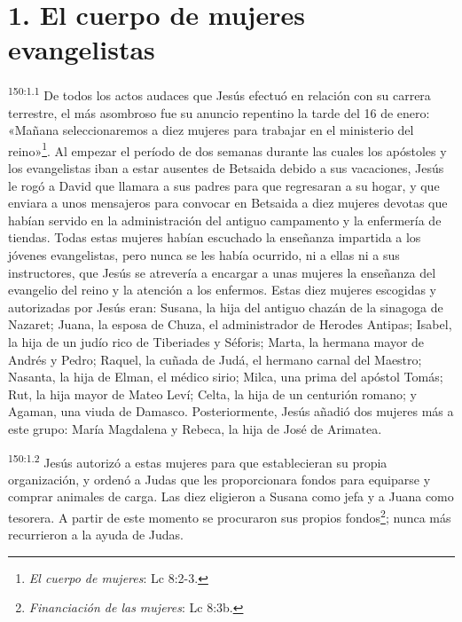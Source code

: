 \section*{1. El cuerpo de mujeres evangelistas}
\par
\textsuperscript{150:1.1} De todos los actos audaces que Jesús efectuó en relación con su carrera terrestre, el más asombroso fue su anuncio repentino la tarde del 16 de enero: «Mañana seleccionaremos a diez mujeres para trabajar en el ministerio del reino»\footnote{\textit{El cuerpo de mujeres}: Lc 8:2-3.}. Al empezar el período de dos semanas durante las cuales los apóstoles y los evangelistas iban a estar ausentes de Betsaida debido a sus vacaciones, Jesús le rogó a David que llamara a sus padres para que regresaran a su hogar, y que enviara a unos mensajeros para convocar en Betsaida a diez mujeres devotas que habían servido en la administración del antiguo campamento y la enfermería de tiendas. Todas estas mujeres habían escuchado la enseñanza impartida a los jóvenes evangelistas, pero nunca se les había ocurrido, ni a ellas ni a sus instructores, que Jesús se atrevería a encargar a unas mujeres la enseñanza del evangelio del reino y la atención a los enfermos. Estas diez mujeres escogidas y autorizadas por Jesús eran: Susana, la hija del antiguo chazán de la sinagoga de Nazaret; Juana, la esposa de Chuza, el administrador de Herodes Antipas; Isabel, la hija de un judío rico de Tiberiades y Séforis; Marta, la hermana mayor de Andrés y Pedro; Raquel, la cuñada de Judá, el hermano carnal del Maestro; Nasanta, la hija de Elman, el médico sirio; Milca, una prima del apóstol Tomás; Rut, la hija mayor de Mateo Leví; Celta, la hija de un centurión romano; y Agaman, una viuda de Damasco. Posteriormente, Jesús añadió dos mujeres más a este grupo: María Magdalena y Rebeca, la hija de José de Arimatea.

\par
\textsuperscript{150:1.2} Jesús autorizó a estas mujeres para que establecieran su propia organización, y ordenó a Judas que les proporcionara fondos para equiparse y comprar animales de carga. Las diez eligieron a Susana como jefa y a Juana como tesorera. A partir de este momento se procuraron sus propios fondos\footnote{\textit{Financiación de las mujeres}: Lc 8:3b.}; nunca más recurrieron a la ayuda de Judas.

